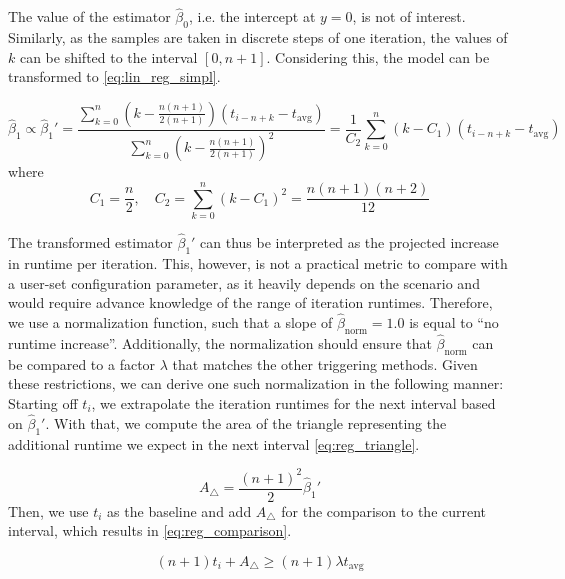 The value of the estimator $\hat\beta_0$, i.e. the intercept at $y=0$, is not of interest. Similarly, as the samples are taken in discrete steps of one iteration, the values of $k$ can be shifted to the interval $\left[0, n+1\right]$. Considering this, the model can be transformed to \eqref{eq:lin_reg_simpl}.

\begin{equation}
	\hat{\beta}_1\propto\hat{\beta}_1' =\frac{\sum_{k=0}^{n}\left(k-\frac{n(n+1)}{2(n+1)}\right)(t_{i-n+k}-t_{\text{avg}})}{\sum_{k=0}^{n}\left(k-\frac{n(n+1)}{2(n+1)}\right)^2}= \frac{1}{C_2}\sum_{k=0}^{n}\left(k-C_1\right)(t_{i-n+k}-t_{\text{avg}})\label{eq:lin_reg_simpl}
\end{equation}
where
\begin{equation}
	C_1 = \frac{n}{2}, \quad C_2=\sum_{k=0}^{n}\left(k-C_1\right)^2=\frac{n(n+1)(n+2)}{12}\label{eq:lin_reg_consts}
\end{equation}


The transformed estimator $\hat\beta_1'$ can thus be interpreted as the projected increase in runtime per iteration. This, however, is not a practical metric to compare with a user-set configuration parameter, as it heavily depends on the scenario and would require advance knowledge of the range of iteration runtimes. Therefore, we use a normalization function, such that a slope of $\hat\beta_{\text{norm}}=1.0$ is equal to \enquote{no runtime increase}. Additionally, the normalization should ensure that $\hat\beta_{\text{norm}}$ can be compared to a factor $\lambda$ that matches the other triggering methods.
Given these restrictions, we can derive one such normalization in the following manner: Starting off $t_i$, we extrapolate the iteration runtimes for the next interval based on $\hat\beta_1'$. With that, we compute the area of the triangle representing the additional runtime we expect in the next interval \eqref{eq:reg_triangle}.

\begin{equation}
	A_\triangle = \frac{(n+1)^2}{2}\hat\beta_1'\label{eq:reg_triangle}
\end{equation}
Then, we use $t_i$ as the baseline and add $A_\bigtriangleup$ for the comparison to the current interval, which results in \eqref{eq:reg_comparison}.

\begin{equation}
	(n+1)t_i + A_\triangle \ge (n+1)\lambda t_{\text{avg}}\label{eq:reg_comparison}
\end{equation}

